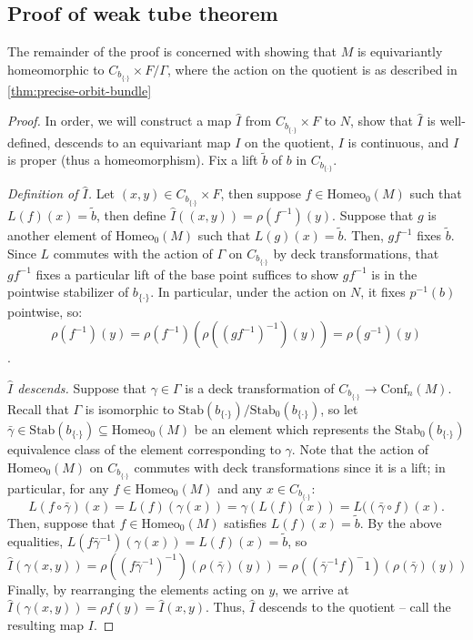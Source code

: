 \documentclass[10pt, oneside]{article}
\newcommand{\homeo}[1][S^1]{\text{Homeo}_0(#1)}
\newcommand{\conf}[2][S^1]{\text{Conf}_{#2}(#1)}
\newcommand{\set}{{\{\cdot\}}}
\newcommand{\stab}[1]{\text{Stab}(#1)}
\newcommand{\pstab}[1]{\text{Stab}_0(#1)}
\newcommand{\maxcov}{C_{b_\set}}
\theoremstyle{definition}
\theoremstyle{definition}
\begin{document}
\subsection{Proof of weak tube theorem}\label{subsec:orbit-bundle-proof}
The remainder of the proof is concerned with showing that $M$  is equivariantly homeomorphic to $\maxcov\times F/\Gamma$, where the action on the quotient is as described in \cref{thm:precise-orbit-bundle}

\begin{proof}
    In order,
    we will construct a map $\hat{I}$ from $\maxcov \times F$ to $N$,
    show that $\hat{I}$ is well-defined,
    descends to an equivariant map $I$ on the quotient,
    $I$ is continuous, and
    $I$ is proper (thus a homeomorphism).
    Fix a lift $\tilde{b}$ of $b$ in $\maxcov$.

    \medskip
    {\it Definition of $\hat{I}$.} Let $(x, y)\in \maxcov\times F$, then
    suppose $f\in\homeo[M]$ such that $L(f)(x) = \tilde{b}$,
    then define $\hat{I}((x,y)) = \rho(f^{-1})(y)$. Suppose that $g$ is another element of $\homeo[M]$ such that $L(g)(x) = \tilde{b}$. Then, $gf^{-1}$ fixes $\tilde{b}$. Since $L$ commutes with the action of $\Gamma$ on $\maxcov$ by deck transformations, that $gf^{-1}$ fixes a particular lift of the base point suffices to show $gf^{-1}$ is in the pointwise stabilizer of $b_{\set}$. In particular, under the action on $N$, it fixes $p^{-1}(b)$ pointwise, so:
$$\rho(f^{-1})(y) = \rho(f^{-1})(\rho((gf^{-1})^{-1})(y)) = \rho(g^{-1})(y)$$.

    \medskip
    {\it $\hat{I}$ descends.} Suppose that $\gamma\in\Gamma$ is a deck transformation of $\maxcov\to \conf[M]{n}$. Recall that $\Gamma$ is isomorphic to $\stab{b_\set}/\pstab{b_\set}$, so let $\bar{\gamma}\in\stab{b_\set}\subseteq\homeo[M]$ be an element which represents the $\pstab{b_\set}$ equivalence class of the element corresponding to $\gamma$. Note that the action of $\homeo[M]$ on $\maxcov$ commutes with deck transformations since it is a lift; in particular, for any $f\in\homeo[M]$ and any $x\in\maxcov$:
    $$L(f\circ\bar{\gamma})(x) = L(f)(\gamma(x)) = \gamma(L(f)(x)) = L((\bar{\gamma}\circ f)(x).$$
    Then, suppose that $f\in\homeo[M]$ satisfies $L(f)(x) = \tilde{b}$. By the above equalities, $L(f\bar{\gamma}^{-1})(\gamma(x)) = L(f)(x) = \tilde{b}$, so $$\hat{I}(\gamma(x, y)) = \rho((f\bar{\gamma}^{-1})^{-1})(\rho(\bar{\gamma})(y)) = \rho((\bar{\gamma}^{-1}f)^-1)(\rho(\bar{\gamma})(y))$$
    Finally, by rearranging the elements acting on $y$, we arrive at $\hat{I}(\gamma(x,y)) = \rho{f}(y) = \hat{I}(x,y)$. Thus, $\hat{I}$ descends to the quotient -- call the resulting map $I$.


\end{proof}
\end{document}
